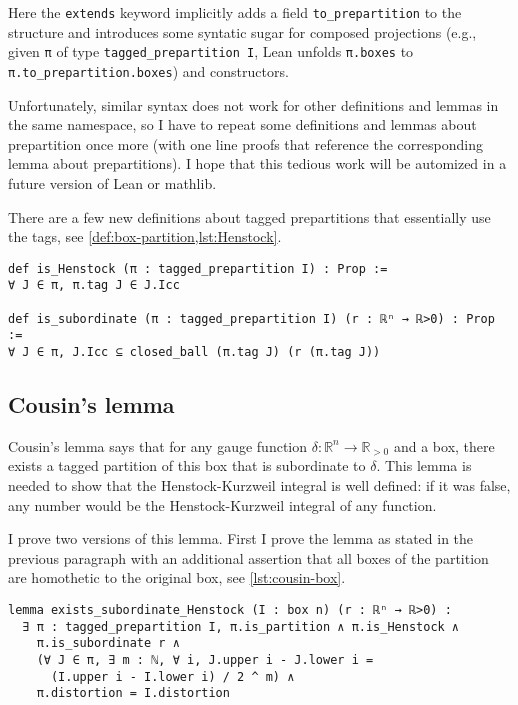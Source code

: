 \documentclass[a4paper, UKenglish,cleveref, autoref, thm-restate]{lipics-v2021}
\newcommand{\bbR}{\mathbb{R}}
\begin{document}
Here the \lstinline=extends= keyword implicitly adds a field
\lstinline=to_prepartition= to the structure and introduces some
syntatic sugar for composed projections (e.g., given \lstinline=π= of
type \lstinline=tagged_prepartition I=, Lean unfolds
\lstinline=π.boxes= to \lstinline=π.to_prepartition.boxes=) and
constructors.

Unfortunately, similar syntax does not work for other definitions and
lemmas in the same namespace, so I have to repeat some definitions and
lemmas about prepartition once more (with one line proofs that
reference the corresponding lemma about prepartitions). I hope that
this tedious work will be automized in a future version of Lean or
mathlib.

There are a few new definitions about tagged prepartitions that
essentially use the tags, see \cref{def:box-partition,lst:Henstock}.

\begin{lstlisting}[caption={Henstock tagged (pre)partitions and (pre)partitions subordinate to a gauge function},label=lst:Henstock]
def is_Henstock (π : tagged_prepartition I) : Prop :=
∀ J ∈ π, π.tag J ∈ J.Icc

def is_subordinate (π : tagged_prepartition I) (r : ℝⁿ → ℝ>0) : Prop :=
∀ J ∈ π, J.Icc ⊆ closed_ball (π.tag J) (r (π.tag J))
\end{lstlisting}

\subsection{Cousin's lemma}\label{sec:cousins-lemma}

Cousin's lemma says that for any gauge function
\(\delta\colon\bbR^{n}\to\bbR_{>0}\) and a box, there exists a tagged
partition of this box that is subordinate to \(\delta\). This lemma is
needed to show that the Henstock-Kurzweil integral is well defined: if
it was false, any number would be the Henstock-Kurzweil integral of
any function.

I prove two versions of this lemma. First I prove the lemma as stated
in the previous paragraph with an additional assertion that all boxes
of the partition are homothetic to the original box, see \autoref{lst:cousin-box}.

\begin{lstlisting}[caption={Cousin's lemma for a box},label=lst:cousin-box]
lemma exists_subordinate_Henstock (I : box n) (r : ℝⁿ → ℝ>0) :
  ∃ π : tagged_prepartition I, π.is_partition ∧ π.is_Henstock ∧
    π.is_subordinate r ∧
    (∀ J ∈ π, ∃ m : ℕ, ∀ i, J.upper i - J.lower i =
      (I.upper i - I.lower i) / 2 ^ m) ∧
    π.distortion = I.distortion
\end{lstlisting}
\end{document}
